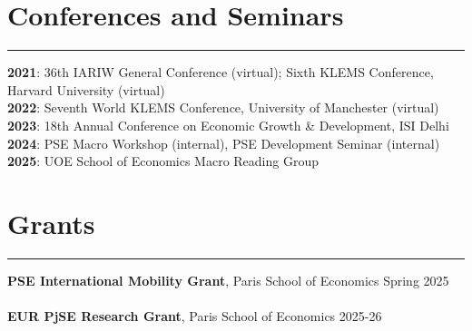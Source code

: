 \documentclass[11pt,a4paper]{article}
\begin{document}
\section*{Conferences and Seminars}
\vspace{-0.5em}
\hrule
\vspace{0.5em}
\textbf{2021}: 36th IARIW General Conference (virtual); Sixth KLEMS Conference, Harvard University (virtual)\\
\textbf{2022}: Seventh World KLEMS Conference, University of Manchester (virtual)\\
\textbf{2023}:  18th Annual Conference on Economic Growth \& Development, ISI Delhi\\ 
\textbf{2024}: PSE Macro Workshop (internal), PSE Development Seminar (internal)\\
\textbf{2025}: UOE School of Economics Macro Reading Group 

\section*{Grants}
\vspace{-0.5em}
\hrule
\vspace{0.5em}
\textbf{PSE International Mobility Grant}, Paris School of Economics \hfill Spring 2025\\
\vspace{-0.3em}\\
\textbf{EUR PjSE Research Grant}, Paris School of Economics \hfill 2025-26

\end{document}
